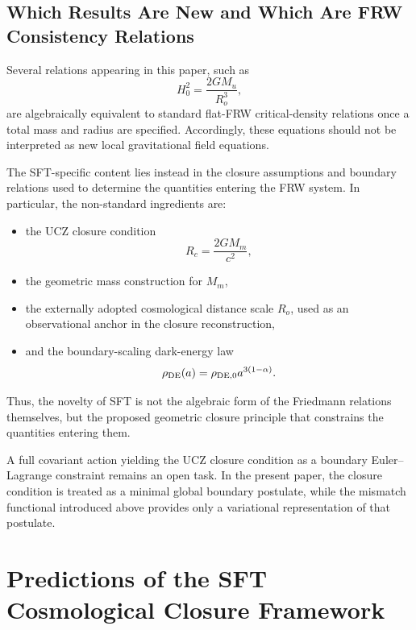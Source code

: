 \documentclass[12pt]{article}
\begin{document}

\subsection{Which Results Are New and Which Are FRW Consistency Relations}
\label{subsec:new_vs_standard}

Several relations appearing in this paper, such as
\begin{equation}
H_0^2=\frac{2GM_u}{R_o^3},
\end{equation}
are algebraically equivalent to standard flat-FRW critical-density relations
once a total mass and radius are specified. Accordingly, these equations
should not be interpreted as new local gravitational field equations.

The SFT-specific content lies instead in the closure assumptions and
boundary relations used to determine the quantities entering the FRW system.
In particular, the non-standard ingredients are:

\begin{itemize}
\item the UCZ closure condition
\[
R_c=\frac{2GM_m}{c^2},
\]

\item the geometric mass construction for \(M_m\),

\item the externally adopted cosmological distance scale \(R_o\),
used as an observational anchor in the closure reconstruction,

\item and the boundary-scaling dark-energy law
\[
\rho_{\rm DE}(a)
=
\rho_{\rm DE,0}a^{3(1-\alpha)}.
\]
\end{itemize}

Thus, the novelty of SFT is not the algebraic form of the Friedmann
relations themselves, but the proposed geometric closure principle that
constrains the quantities entering them.

A full covariant action yielding the UCZ closure condition as a boundary
Euler--Lagrange constraint remains an open task. In the present paper,
the closure condition is treated as a minimal global boundary postulate,
while the mismatch functional introduced above provides only a
variational representation of that postulate.


\section{Predictions of the SFT Cosmological Closure Framework}
\label{sec:predictions}
\end{document}
